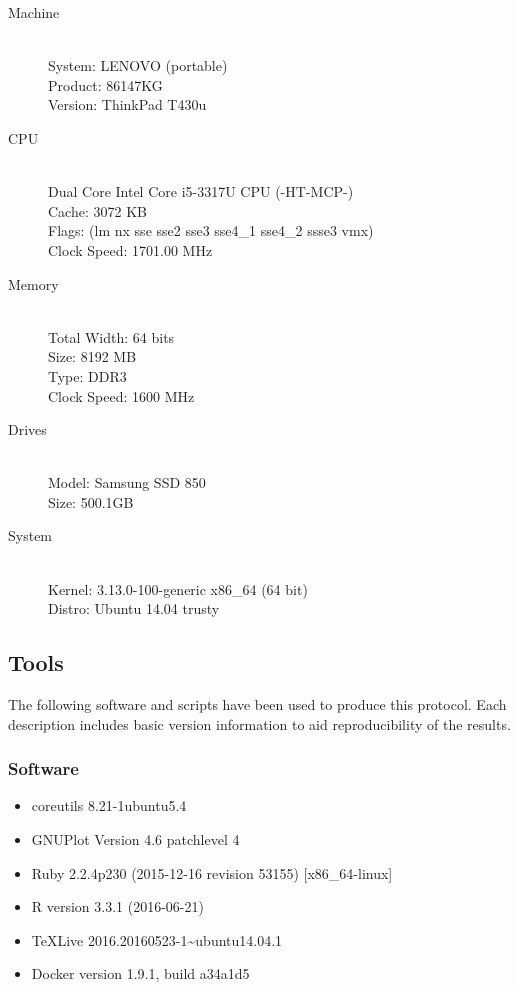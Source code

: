 \documentclass[a4paper,12pt]{article}
\begin{document}
\begin{description}
    \item[Machine] \hfill \\
    System: LENOVO (portable) \\
    Product: 86147KG \\
    Version: ThinkPad T430u

    \item[CPU] \hfill \\
    Dual Core Intel Core i5-3317U CPU (-HT-MCP-) \\
    Cache: 3072 KB \\
    Flags: (lm nx sse sse2 sse3 sse4\_1 sse4\_2 ssse3 vmx) \\
    Clock Speed: 1701.00 MHz

    \item[Memory] \hfill \\
    Total Width: 64 bits \\
    Size: 8192 MB \\
    Type: DDR3 \\
    Clock Speed: 1600 MHz

    \item[Drives] \hfill \\
    Model: Samsung SSD 850 \\
    Size: 500.1GB

    \item[System] \hfill \\
    Kernel: 3.13.0-100-generic x86\_64 (64 bit) \\
    Distro: Ubuntu 14.04 trusty \\
\end{description}

\subsection{Tools}
\label{subsec:tools}

The following software and scripts have been used to produce this protocol. Each description
includes basic version information to aid reproducibility of the results.

\subsubsection*{Software}
\begin{itemize}
    \item coreutils 8.21-1ubuntu5.4
    \item GNUPlot Version 4.6 patchlevel 4
    \item Ruby 2.2.4p230 (2015-12-16 revision 53155) [x86\_64-linux]
    \item R version 3.3.1 (2016-06-21)
    \item TeXLive 2016.20160523-1\~{}ubuntu14.04.1
    \item Docker version 1.9.1, build a34a1d5
\end{itemize}
\end{document}
